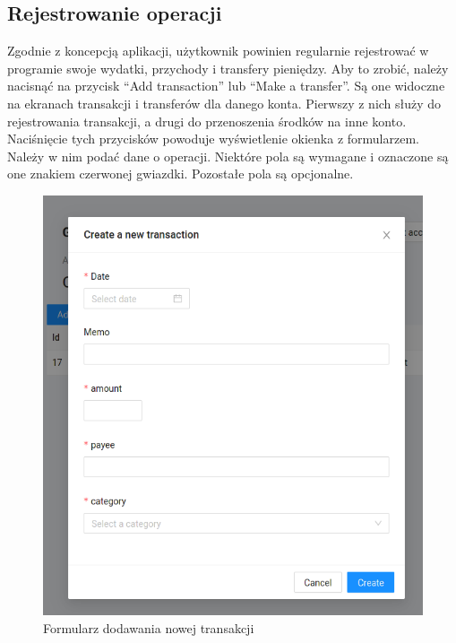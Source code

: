 \documentclass[shortabstract,inz]{iithesis}
\begin{document}
\subsection{Rejestrowanie operacji}
Zgodnie z koncepcją aplikacji, użytkownik powinien regularnie rejestrować w programie swoje wydatki, przychody i transfery pieniędzy. Aby to zrobić, należy nacisnąć na przycisk ``Add transaction'' lub ``Make a transfer''. Są one widoczne na ekranach transakcji i transferów dla danego konta. Pierwszy z nich służy do rejestrowania transakcji, a drugi do przenoszenia środków na inne konto. Naciśnięcie tych przycisków powoduje wyświetlenie okienka z formularzem. Należy w nim podać dane o operacji. Niektóre pola są wymagane i oznaczone są one znakiem czerwonej gwiazdki. Pozostałe pola są opcjonalne.
\begin{figure}
	\centering
	\includegraphics[scale=0.7]{screen-new-transaction-form.png}
	\caption{Formularz dodawania nowej transakcji}
	\label{fig:screen-new-transaction}
\end{figure}
\end{document}
